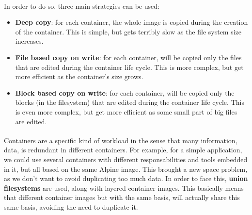 \paragraph{}In order to do so, three main strategies can be used:
\begin{itemize}
\renewcommand\labelitemi{--}
  \item \textbf{Deep copy}: for each container, the whole image is copied during the creation of the container.  This is simple, but gets terribly slow as the file system size increases.
  \item \textbf{File based copy on write}: for each container, will be copied only the files that are edited during the container life cycle.  This is more complex, but get more efficient as the container's size grows.
  \item \textbf{Block based copy on write}: for each container, will be copied only the blocks (in the filesystem) that are edited during the container life cycle.  This is even more complex, but get more efficient as some small part of big files are edited.
\end{itemize}

\paragraph{}Containers are a specific kind of workload in the sense that many information, data, is redundant in different containers.  For example, for a simple application, we could use several containers with different responsabilities and tools embedded in it, but all based on the same Alpine image.  This brought a new space problem, as we don't want to avoid duplicating too much data.  In order to face this, \textbf{union filesystems} are used, along with layered container images.  This basically means that different container images but with the same basis, will actually share this same basis, avoiding the need to duplicate it.

